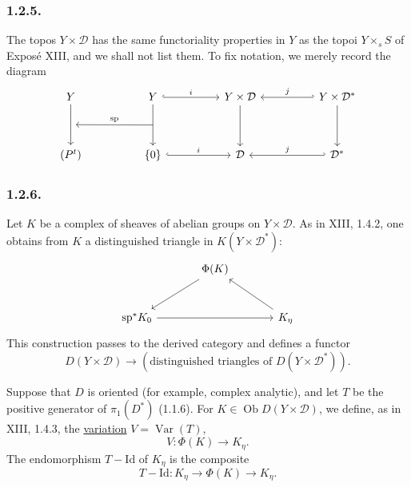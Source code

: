 \subsubsection*{1.2.5.}
The topos $Y\times\mathcal D$ has the same functoriality properties
in $Y$ as the topoi $Y\times_s S$ of Expos\'e XIII, and we shall not
list them.  To fix notation, we merely record the diagram
\[
\begin{tikzcd}[row sep=huge, column sep=huge]
Y \arrow[d, ""{name=A}]
  & Y \arrow[d, ""{name=B}] \arrow[r, hook, "i"]
  & Y\times\mathcal D \arrow[d]
  & Y\times\mathcal D^* \arrow[d] \arrow[l, hook', "j"'] \\
(P^t)
  & \{0\} \arrow[r, hook, "i"]
  & \mathcal D
  & \mathcal D^* \arrow[l, hook', "j"']
    \arrow[from=B, to=A, "\mathrm{sp}"']
\end{tikzcd}
\]

\subsubsection*{1.2.6.}
Let $K$ be a complex of sheaves of abelian groups on
$Y\times\mathcal D$.  As in XIII, 1.4.2, one obtains from $K$ a
distinguished triangle in $K(Y\times\mathcal D^*)$:
\[
\begin{tikzcd}[row sep=large, column sep=large]
{} & \Phi(K) \arrow[dl] & {} \\
\mathrm{sp}^*K_0 \arrow[rr] & {} & K_\eta \arrow[ul]
\end{tikzcd}
\]
This construction passes to the derived category and defines a
functor
\[
D(Y\times\mathcal D)
\longrightarrow
(\text{distinguished triangles of }D(Y\times\mathcal D^*)).
\]

Suppose that $D$ is oriented (for example, complex analytic), and
let $T$ be the positive generator of $\pi_1(D^*)$ (1.1.6).  For
$K\in\operatorname{Ob}D(Y\times\mathcal D)$, we define, as in XIII,
1.4.3, the \underline{variation} $V=\operatorname{Var}(T)$,
\[
V:\Phi(K)\longrightarrow K_\eta.
\]
The endomorphism $T-\mathrm{Id}$ of $K_\eta$ is the composite
\[
T-\mathrm{Id}:K_\eta\longrightarrow\Phi(K)
\longrightarrow K_\eta.
\]


